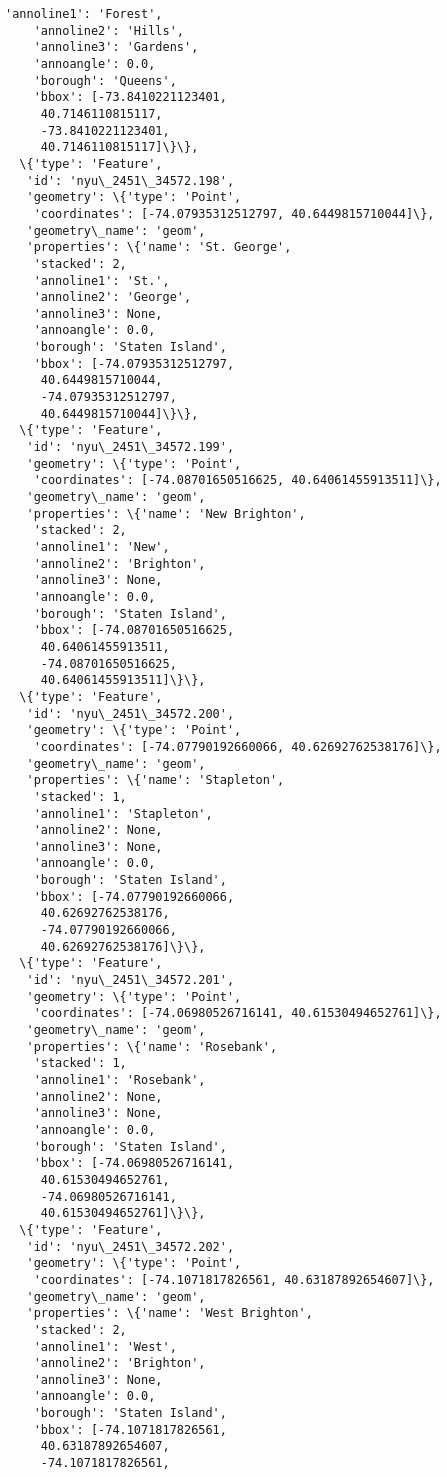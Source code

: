 \documentclass[11pt]{article}
\begin{document}
\begin{tcolorbox}[breakable, size=fbox, boxrule=.5pt, pad at break*=1mm, opacityfill=0]
\begin{Verbatim}[commandchars=\\\{\}]
    'annoline1': 'Forest',
    'annoline2': 'Hills',
    'annoline3': 'Gardens',
    'annoangle': 0.0,
    'borough': 'Queens',
    'bbox': [-73.8410221123401,
     40.7146110815117,
     -73.8410221123401,
     40.7146110815117]\}\},
  \{'type': 'Feature',
   'id': 'nyu\_2451\_34572.198',
   'geometry': \{'type': 'Point',
    'coordinates': [-74.07935312512797, 40.6449815710044]\},
   'geometry\_name': 'geom',
   'properties': \{'name': 'St. George',
    'stacked': 2,
    'annoline1': 'St.',
    'annoline2': 'George',
    'annoline3': None,
    'annoangle': 0.0,
    'borough': 'Staten Island',
    'bbox': [-74.07935312512797,
     40.6449815710044,
     -74.07935312512797,
     40.6449815710044]\}\},
  \{'type': 'Feature',
   'id': 'nyu\_2451\_34572.199',
   'geometry': \{'type': 'Point',
    'coordinates': [-74.08701650516625, 40.64061455913511]\},
   'geometry\_name': 'geom',
   'properties': \{'name': 'New Brighton',
    'stacked': 2,
    'annoline1': 'New',
    'annoline2': 'Brighton',
    'annoline3': None,
    'annoangle': 0.0,
    'borough': 'Staten Island',
    'bbox': [-74.08701650516625,
     40.64061455913511,
     -74.08701650516625,
     40.64061455913511]\}\},
  \{'type': 'Feature',
   'id': 'nyu\_2451\_34572.200',
   'geometry': \{'type': 'Point',
    'coordinates': [-74.07790192660066, 40.62692762538176]\},
   'geometry\_name': 'geom',
   'properties': \{'name': 'Stapleton',
    'stacked': 1,
    'annoline1': 'Stapleton',
    'annoline2': None,
    'annoline3': None,
    'annoangle': 0.0,
    'borough': 'Staten Island',
    'bbox': [-74.07790192660066,
     40.62692762538176,
     -74.07790192660066,
     40.62692762538176]\}\},
  \{'type': 'Feature',
   'id': 'nyu\_2451\_34572.201',
   'geometry': \{'type': 'Point',
    'coordinates': [-74.06980526716141, 40.61530494652761]\},
   'geometry\_name': 'geom',
   'properties': \{'name': 'Rosebank',
    'stacked': 1,
    'annoline1': 'Rosebank',
    'annoline2': None,
    'annoline3': None,
    'annoangle': 0.0,
    'borough': 'Staten Island',
    'bbox': [-74.06980526716141,
     40.61530494652761,
     -74.06980526716141,
     40.61530494652761]\}\},
  \{'type': 'Feature',
   'id': 'nyu\_2451\_34572.202',
   'geometry': \{'type': 'Point',
    'coordinates': [-74.1071817826561, 40.63187892654607]\},
   'geometry\_name': 'geom',
   'properties': \{'name': 'West Brighton',
    'stacked': 2,
    'annoline1': 'West',
    'annoline2': 'Brighton',
    'annoline3': None,
    'annoangle': 0.0,
    'borough': 'Staten Island',
    'bbox': [-74.1071817826561,
     40.63187892654607,
     -74.1071817826561,

\end{Verbatim}
\end{tcolorbox}
\end{document}

